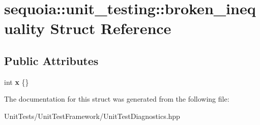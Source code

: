 \hypertarget{structsequoia_1_1unit__testing_1_1broken__inequality}{}\section{sequoia\+::unit\+\_\+testing\+::broken\+\_\+inequality Struct Reference}
\label{structsequoia_1_1unit__testing_1_1broken__inequality}
\subsection*{Public Attributes}
\begin{DoxyCompactItemize}
\item 
\mbox{\label{structsequoia_1_1unit__testing_1_1broken__inequality_aa21c0668706950bb29e264ba32374841}} 
int {\bfseries x} \{\}
\end{DoxyCompactItemize}


The documentation for this struct was generated from the following file\+:\begin{DoxyCompactItemize}
\item 
Unit\+Tests/\+Unit\+Test\+Framework/Unit\+Test\+Diagnostics.\+hpp\end{DoxyCompactItemize}
